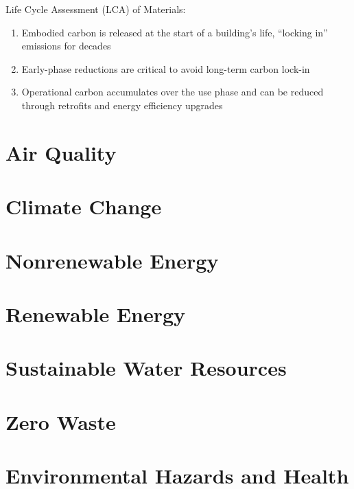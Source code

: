 \documentclass[12pt, a4paper]{article}
\begin{document}
\begin{multicols*}{3}
Life Cycle Assessment (LCA) of Materials:
\begin{enumerate}[\roman*.]
  \item Embodied carbon is released at the start of a building's life, ``locking in'' emissions for decades
  \item Early-phase reductions are critical to avoid long-term carbon lock-in
  \item Operational carbon accumulates over the use phase and can be reduced through retrofits and energy efficiency upgrades
\end{enumerate}

\colbreak
\section{Air Quality}
\section{Climate Change}
\section{Nonrenewable Energy}
\section{Renewable Energy}
\section{Sustainable Water Resources}
\section{Zero Waste}
\section{Environmental Hazards and Health}

\end{multicols*}
\end{document}
